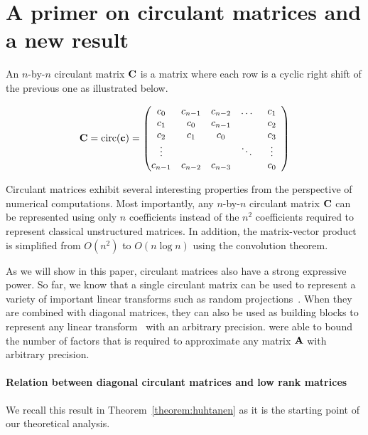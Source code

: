 \section{A primer on circulant matrices and a new result}
\label{section:circulant}

An $n$-by-$n$ circulant matrix $\mathbf{C}$ is a matrix where each row is a cyclic right shift of the previous one as illustrated below.

\begin{equation}
    \mathbf{C} = \mathrm{circ}(\mathbf{c}) = \begin{pmatrix}
    c_{0} & c_{n-1} & c_{n-2} & \dots & c_{1} \\
    c_{1} & c_{0} & c_{n-1} & & c_{2} \\
    c_{2} & c_{1} & c_{0}& & c_{3} \\
    \vdots & & & \ddots & \vdots \\
    c_{n-1} & c_{n-2} & c_{n-3} & & \phantom{0}c_{0}\phantom{0}
    \end{pmatrix}
\end{equation}

Circulant matrices exhibit several interesting properties from the perspective of numerical computations.
Most importantly, any $n$-by-$n$ circulant matrix $\mathbf{C}$ can be represented using only $n$ coefficients instead of the $n^2$ coefficients required to represent classical unstructured matrices.
In addition, the matrix-vector product is simplified from $O(n^2)$ to $O(n \log n)$ using the  convolution theorem.

As we will show in this paper, circulant matrices also have a strong expressive power.
So far, we know that a single circulant matrix can be used to represent a variety of important linear transforms such as random projections~\cite{hinrichs2011johnson}. 
When they are combined with diagonal matrices, they can also be used as building blocks to represent any linear transform~\cite{schmid2000decomposing, Huhtanen2015} with an arbitrary precision.
\citet{Huhtanen2015} were able to bound the number of factors that is required to approximate any matrix $\mathbf{A}$ with arbitrary precision.

\paragraph{Relation between diagonal circulant matrices and low rank matrices}
We recall this result in Theorem~\ref{theorem:huhtanen} as it is the starting point of our theoretical analysis.


